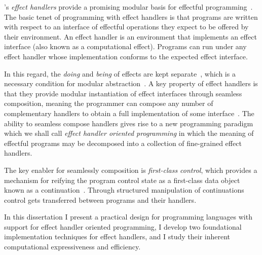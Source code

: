 \documentclass[12pt,phd,lfcs,twoside,openright,logo,leftchapter,normalheadings]{infthesis}
\theoremstyle{plain}
\theoremstyle{definition}
\begin{document}
\citeauthor{PlotkinP09}'s \emph{effect handlers} provide a promising
modular basis for effectful
programming~\cite{PlotkinP09,PlotkinP13,KammarLO13}. The basic tenet
of programming with effect handlers is that programs are written with
respect to an interface of effectful operations they expect to be
offered by their environment.
%
An effect handler is an environment that implements an effect
interface (also known as a computational effect).
%
Programs can run under any effect handler whose implementation
conforms to the expected effect interface.
%

In this regard, the \emph{doing} and \emph{being} of effects are kept
separate~\cite{JonesW93,LindleyMM17}, which is a necessary condition
for modular abstraction~\cite{Parnas72}.
%
A key property of effect handlers is that they provide modular
instantiation of effect interfaces through seamless composition,
meaning the programmer can compose any number of complementary
handlers to obtain a full implementation of some
interface~\cite{HillerstromL16}.
%
The ability to seamless compose handlers gives rise to a new
programming paradigm which we shall call \emph{effect handler oriented
  programming} in which the meaning of effectful programs may be
decomposed into a collection of fine-grained effect handlers.

The key enabler for seamlessly composition is \emph{first-class
  control}, which provides a mechanism for reifying the program
control state as a first-class data object known as a
continuation~\cite{FriedmanHK84}.
%
Through structured manipulation of continuations control gets
transferred between programs and their handlers.

In this dissertation I present a practical design for programming
languages with support for effect handler oriented programming, I
develop two foundational implementation techniques for effect
handlers, and I study their inherent computational expressiveness and
efficiency.


%
\end{document}
